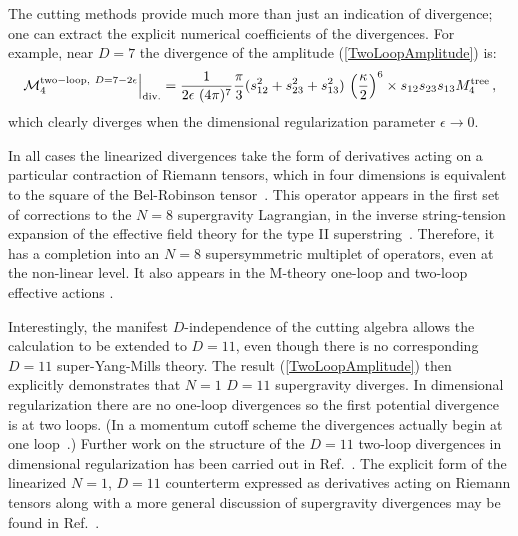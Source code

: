 The cutting methods provide much more than just an indication 
of divergence; one can extract the explicit numerical coefficients
of the divergences. For example, near $D=7$ the divergence of the
amplitude (\ref{TwoLoopAmplitude}) is:
%
\begin{equation}
{\cal M}_4^{{\rm two-loop},\ D=7-2 \epsilon}\Bigr\vert_{\rm div.} = 
 {1\over 2 \epsilon\ (4\pi)^7} {\pi\over3} (s_{12}^2+s_{23}^2+s_{13}^2) \, 
\left( {\kappa \over 2}\right)^6 
\times s_{12} s_{23} s_{13} M_4^{\rm tree} \,, 
\label{gravtwolooppoles}
\end{equation}
%
which clearly diverges when the dimensional regularization parameter 
$\epsilon \rightarrow 0$.

In all cases the linearized divergences take the form of derivatives
acting on a particular contraction of Riemann tensors, which in four
dimensions is equivalent to the square of the Bel-Robinson
tensor~\cite{Bel,Deser99BelRobinsonA,Deser99BelRobinsonB}.  This
operator appears in the first set of corrections to the $N=8$
supergravity Lagrangian, in the inverse string-tension expansion of
the effective field theory for the type II
superstring~\cite{GrossWitten}.  Therefore, it has a completion
into an $N=8$ supersymmetric multiplet of operators, even at the
non-linear level.  It also appears in the M-theory one-loop and
two-loop effective actions \cite{StringR4,Tseytlin,GreenTwoLoop}.

Interestingly, the manifest $D$-independence of the cutting algebra
allows the calculation to be extended to $D=11$, even though there is
no corresponding $D=11$ super-Yang-Mills theory. The result
(\ref{TwoLoopAmplitude}) then explicitly demonstrates that $N=1$
$D=11$ supergravity diverges.  In dimensional regularization there are
no one-loop divergences so the first potential divergence is at two
loops.  (In a momentum cutoff scheme the divergences actually begin at
one loop~\cite{Tseytlin}.)  Further work on the structure of the
$D=11$ two-loop divergences in dimensional regularization has been
carried out in Ref.~\cite{DeserSeminara99,DeserSeminara00}.  The
explicit form of the linearized $N=1$, $D=11$ counterterm expressed as
derivatives acting on Riemann tensors along with a more general
discussion of supergravity divergences may be found in
Ref.~\cite{Bern00Counterterms}.

